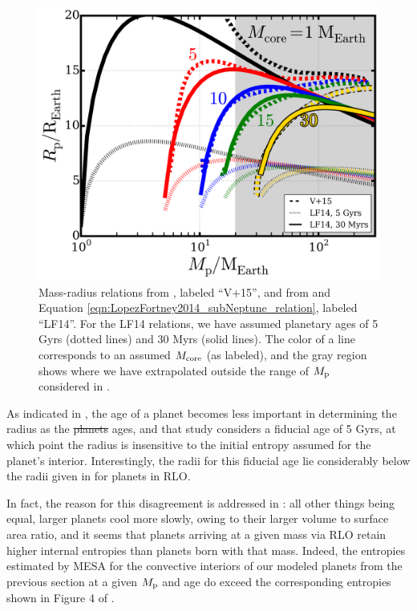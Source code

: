 \documentclass{svjour3}                     %
\providecommand{\DIFadd}[1]{{\protect\color{blue}\uwave{#1}}} %
\providecommand{\DIFdel}[1]{{\protect\color{red}\sout{#1}}}                      %
\providecommand{\DIFaddbegin}{} %
\providecommand{\DIFaddend}{} %
\providecommand{\DIFdelbegin}{} %
\providecommand{\DIFdelend}{} %
\begin{document}
\begin{figure}
\includegraphics[width=\textwidth]{compare_mass-radius_relations}
\caption{Mass-radius relations from \cite{2015ApJ...813..101V}, labeled ``V+15'', and from \cite{Lopez2014Understanding} and Equation \ref{eqn:LopezFortney2014_subNeptune_relation}, labeled ``LF14''. For the LF14 relations, we have assumed planetary ages of 5 Gyrs (dotted lines) and 30 Myrs (solid lines). The color of a line corresponds to an assumed $M_{\rm core}$ (as labeled), and the gray region shows where we have extrapolated outside the range of $M_{\rm p}$ considered in \cite{Lopez2014Understanding}.}
\label{fig:compare_mass-radius_relations}
\end{figure}

As indicated in \cite{2014ApJ...793L...3V}, the age of a planet becomes less important in determining the radius as the \DIFdelbegin \DIFdel{planets }\DIFdelend \DIFaddbegin \DIFadd{planet }\DIFaddend ages, and that study considers a fiducial age of 5 Gyrs, at which point the radius is insensitive to the initial entropy assumed for the planet's interior. Interestingly, the radii for this fiducial age lie considerably below the radii given in \cite{2015ApJ...813..101V} for planets in RLO. 

In fact, the reason for this disagreement is addressed in \cite{2014ApJ...793L...3V}: all other things being equal, larger planets cool more slowly, owing to their larger volume to surface area ratio, and it seems that planets arriving at a given mass via RLO retain higher internal entropies than planets born with that mass. Indeed, the entropies estimated by MESA for the convective interiors of our modeled planets from the previous section at a given $M_{\rm p}$ and age do exceed the corresponding entropies shown in Figure 4 of \cite{2014ApJ...793L...3V}. 
\end{document}
